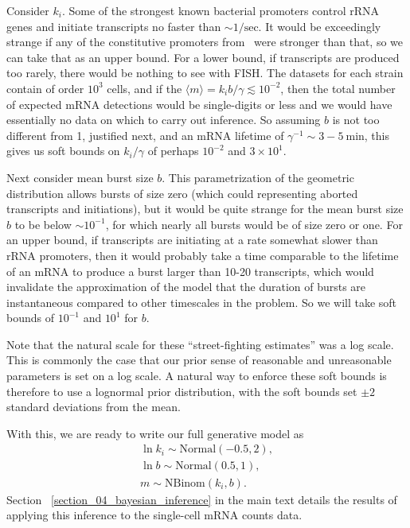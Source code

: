 Consider $k_i$. Some of the strongest known bacterial promoters control rRNA
genes and initiate transcripts no faster than $\sim 1/\text{sec}$. It would be
exceedingly strange if any of the constitutive promoters from~\cite{Jones2014}
were stronger than that, so we can take that as an upper bound. For a lower
bound, if transcripts are produced too rarely, there would be nothing to see
with FISH. The datasets for each strain contain of order $10^3$ cells, and if
the $\langle m \rangle = k_i b/\gamma \lesssim 10^{-2}$, then the total number
of expected mRNA detections would be single-digits or less and we would have
essentially no data on which to carry out inference. So assuming $b$ is not too
different from 1, justified next, and an mRNA lifetime of $\gamma^{-1}\sim
3-5~\text{min}$, this gives us soft bounds on $k_i/\gamma$ of perhaps $10^{-2}$
and $3\times 10^1$.

Next consider mean burst size $b$. This parametrization of the geometric
distribution allows bursts of size zero (which could representing aborted
transcripts and initiations), but it would be quite strange for the mean burst
size $b$ to be below $\sim10^{-1}$, for which nearly all bursts would be of size
zero or one. For an upper bound, if transcripts are initiating at a rate
somewhat slower than rRNA promoters, then it would probably take a time
comparable to the lifetime of an mRNA to produce a burst larger than 10-20
transcripts, which would invalidate the approximation of the model that the
duration of bursts are instantaneous compared to other timescales in the
problem. So we will take soft bounds of $10^{-1}$ and $10^1$ for $b$.

Note that the natural scale for these ``street-fighting estimates'' was a log
scale. This is commonly the case that our prior sense of reasonable and
unreasonable parameters is set on a log scale. A natural way to enforce these
soft bounds is therefore to use a lognormal prior distribution, with the soft
bounds set $\pm2$ standard deviations from the mean.

With this, we are ready to write our full generative model as
\begin{equation}
\begin{split}
\ln k_i \sim \text{Normal}(-0.5, 2),
\\
\ln b \sim \text{Normal}(0.5, 1),
\\
m \sim \text{NBinom}(k_i, b).
\end{split}
\end{equation}
Section ~\ref{section_04_bayesian_inference} in the main text details the
results of applying this inference to the single-cell mRNA counts data.

